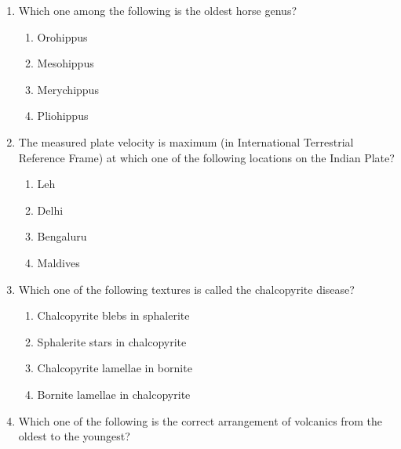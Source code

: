 \documentclass[journal,12pt,onecolumn]{IEEEtran}
\begin{document}
\begin{enumerate}
\item Which one among the following is the oldest horse genus?  

\hfill{}

\begin{multicols}{2}
\begin{enumerate}
\item Orohippus
\item Mesohippus
\item Merychippus
\item Pliohippus
\end{enumerate}
\end{multicols}

\item The measured plate velocity is maximum (in International Terrestrial Reference Frame) at which one of the following locations on the Indian Plate?  

\hfill{}

\begin{multicols}{2}
\begin{enumerate}
\item Leh
\item Delhi
\item Bengaluru
\item Maldives
\end{enumerate}
\end{multicols}

\item Which one of the following textures is called the chalcopyrite disease?  

\hfill{}

\begin{multicols}{2}
\begin{enumerate}
\item Chalcopyrite blebs in sphalerite
\item Sphalerite stars in chalcopyrite
\item Chalcopyrite lamellae in bornite
\item Bornite lamellae in chalcopyrite
\end{enumerate}
\end{multicols}

\item Which one of the following is the correct arrangement of volcanics from the oldest to the youngest?  

\hfill{}


\end{enumerate}
\end{document}
